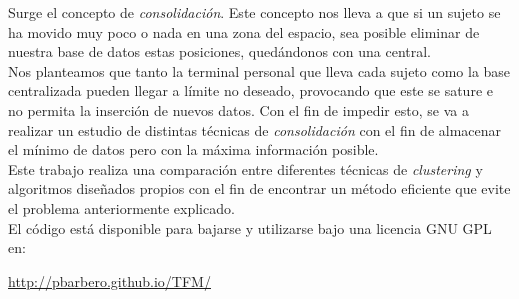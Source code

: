 \documentclass[a4paper, 12pt, spanish]{article}
\begin{document}
Surge el concepto de \textit{consolidaci\'on}. Este concepto nos lleva a que si un sujeto se ha movido muy poco o nada en una zona del espacio, sea posible eliminar de nuestra base de datos estas posiciones, qued\'andonos con una central.\\

Nos planteamos que tanto la terminal personal que lleva cada sujeto como la base centralizada pueden llegar a l\'imite no deseado, provocando que este se sature e no permita la inserci\'on de nuevos datos. Con el fin de impedir esto, se va a realizar un estudio de distintas t\'ecnicas de \textit{consolidaci\'on} con el fin de almacenar el m\'inimo de datos pero con la m\'axima informaci\'on posible. \\

Este trabajo realiza una comparaci\'on entre diferentes t\'ecnicas de \textit{clustering} y algoritmos dise\~nados propios con el fin de encontrar un m\'etodo eficiente que evite el problema anteriormente explicado. \\

El c\'odigo est\'a disponible para bajarse y utilizarse bajo una licencia GNU GPL en:\\

\begin{center}
	\href{http://pbarbero.github.io/TFM/}{\textsf{http://pbarbero.github.io/TFM/}}

\end{center}
\end{document}
